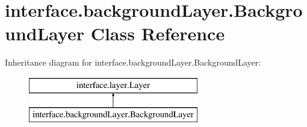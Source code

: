 \hypertarget{classinterface_1_1background_layer_1_1_background_layer}{\section{interface.\-background\-Layer.\-Background\-Layer \-Class \-Reference}
\label{classinterface_1_1background_layer_1_1_background_layer}
}
\-Inheritance diagram for interface.\-background\-Layer.\-Background\-Layer\-:\begin{figure}[H]
\begin{center}
\leavevmode
\includegraphics[height=2.000000cm]{classinterface_1_1background_layer_1_1_background_layer}
\end{center}
\end{figure}
